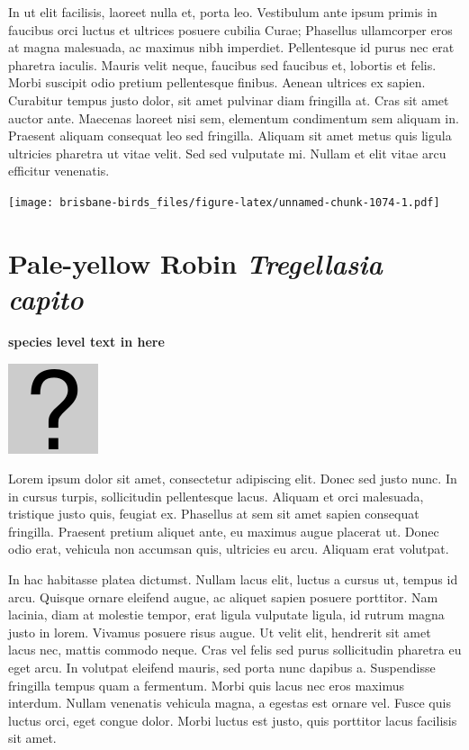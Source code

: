 \documentclass[]{book}
\let\origfigure\figure
\let\endorigfigure\endfigure
\renewenvironment{figure}[1][2] {
  \expandafter\origfigure\expandafter[H]
} {
  \endorigfigure
}
\begin{document}
In ut elit facilisis, laoreet nulla et, porta leo. Vestibulum ante ipsum
primis in faucibus orci luctus et ultrices posuere cubilia Curae;
Phasellus ullamcorper eros at magna malesuada, ac maximus nibh
imperdiet. Pellentesque id purus nec erat pharetra iaculis. Mauris velit
neque, faucibus sed faucibus et, lobortis et felis. Morbi suscipit odio
pretium pellentesque finibus. Aenean ultrices ex sapien. Curabitur
tempus justo dolor, sit amet pulvinar diam fringilla at. Cras sit amet
auctor ante. Maecenas laoreet nisi sem, elementum condimentum sem
aliquam in. Praesent aliquam consequat leo sed fringilla. Aliquam sit
amet metus quis ligula ultricies pharetra ut vitae velit. Sed sed
vulputate mi. Nullam et elit vitae arcu efficitur venenatis.

\begin{figure}
\centering
\texttt{[image: brisbane-birds\_files/figure-latex/unnamed-chunk-1074-1.pdf]}
\caption{\label{fig:unnamed-chunk-1074}insert figure caption}
\end{figure}

\section{\texorpdfstring{Pale-yellow Robin \emph{Tregellasia
capito}}{Pale-yellow Robin Tregellasia capito}}\label{pale-yellow-robin-tregellasia-capito}

\textbf{species level text in here}

\begin{figure}
\centering
\includegraphics{assets/missing.png}
\caption{No image for species}
\end{figure}

Lorem ipsum dolor sit amet, consectetur adipiscing elit. Donec sed justo
nunc. In in cursus turpis, sollicitudin pellentesque lacus. Aliquam et
orci malesuada, tristique justo quis, feugiat ex. Phasellus at sem sit
amet sapien consequat fringilla. Praesent pretium aliquet ante, eu
maximus augue placerat ut. Donec odio erat, vehicula non accumsan quis,
ultricies eu arcu. Aliquam erat volutpat.

In hac habitasse platea dictumst. Nullam lacus elit, luctus a cursus ut,
tempus id arcu. Quisque ornare eleifend augue, ac aliquet sapien posuere
porttitor. Nam lacinia, diam at molestie tempor, erat ligula vulputate
ligula, id rutrum magna justo in lorem. Vivamus posuere risus augue. Ut
velit elit, hendrerit sit amet lacus nec, mattis commodo neque. Cras vel
felis sed purus sollicitudin pharetra eu eget arcu. In volutpat eleifend
mauris, sed porta nunc dapibus a. Suspendisse fringilla tempus quam a
fermentum. Morbi quis lacus nec eros maximus interdum. Nullam venenatis
vehicula magna, a egestas est ornare vel. Fusce quis luctus orci, eget
congue dolor. Morbi luctus est justo, quis porttitor lacus facilisis sit
amet.
\end{document}
